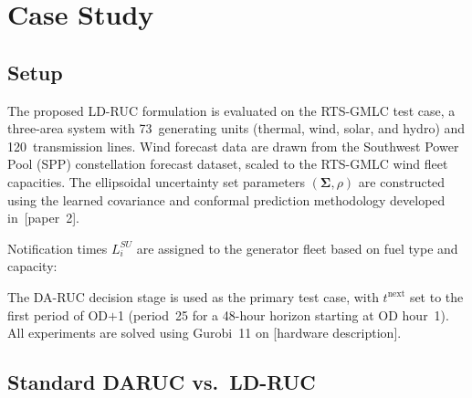 \documentclass[journal]{IEEEtran}
\begin{document}
\section{Case Study}\label{sec:casestudy}

\subsection{Setup}

The proposed LD-RUC formulation is evaluated on the RTS-GMLC test
case, a three-area system with 73~generating units (thermal, wind,
solar, and hydro) and 120~transmission lines.
Wind forecast data are drawn from the Southwest Power Pool (SPP)
constellation forecast dataset, scaled to the RTS-GMLC wind fleet
capacities.
The ellipsoidal uncertainty set parameters
$(\boldsymbol{\Sigma}, \rho)$ are constructed using the learned
covariance and conformal prediction methodology developed
in~[paper~2].

Notification times $L_i^{SU}$ are assigned to the generator fleet
based on fuel type and capacity:

The DA-RUC decision stage is used as the primary test case, with
$t^{\text{next}}$ set to the first period of OD$+$1 (period~25 for a
48-hour horizon starting at OD hour~1).
All experiments are solved using Gurobi~11 on [hardware description].

\subsection{Standard DARUC vs.\ LD-RUC}\label{sec:results_daruc}

\end{document}
